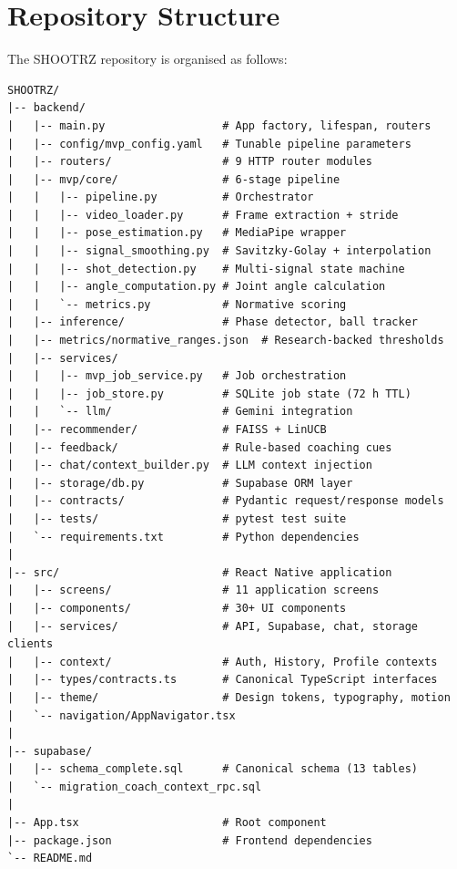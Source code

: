 
\chapter{Repository Structure}
\label{app:repo}

The SHOOTRZ repository is organised as follows:

\begin{lstlisting}[language={},caption={Top-level repository structure.},label={lst:repo}]
SHOOTRZ/
|-- backend/
|   |-- main.py                  # App factory, lifespan, routers
|   |-- config/mvp_config.yaml   # Tunable pipeline parameters
|   |-- routers/                 # 9 HTTP router modules
|   |-- mvp/core/                # 6-stage pipeline
|   |   |-- pipeline.py          # Orchestrator
|   |   |-- video_loader.py      # Frame extraction + stride
|   |   |-- pose_estimation.py   # MediaPipe wrapper
|   |   |-- signal_smoothing.py  # Savitzky-Golay + interpolation
|   |   |-- shot_detection.py    # Multi-signal state machine
|   |   |-- angle_computation.py # Joint angle calculation
|   |   `-- metrics.py           # Normative scoring
|   |-- inference/               # Phase detector, ball tracker
|   |-- metrics/normative_ranges.json  # Research-backed thresholds
|   |-- services/
|   |   |-- mvp_job_service.py   # Job orchestration
|   |   |-- job_store.py         # SQLite job state (72 h TTL)
|   |   `-- llm/                 # Gemini integration
|   |-- recommender/             # FAISS + LinUCB
|   |-- feedback/                # Rule-based coaching cues
|   |-- chat/context_builder.py  # LLM context injection
|   |-- storage/db.py            # Supabase ORM layer
|   |-- contracts/               # Pydantic request/response models
|   |-- tests/                   # pytest test suite
|   `-- requirements.txt         # Python dependencies
|
|-- src/                         # React Native application
|   |-- screens/                 # 11 application screens
|   |-- components/              # 30+ UI components
|   |-- services/                # API, Supabase, chat, storage clients
|   |-- context/                 # Auth, History, Profile contexts
|   |-- types/contracts.ts       # Canonical TypeScript interfaces
|   |-- theme/                   # Design tokens, typography, motion
|   `-- navigation/AppNavigator.tsx
|
|-- supabase/
|   |-- schema_complete.sql      # Canonical schema (13 tables)
|   `-- migration_coach_context_rpc.sql
|
|-- App.tsx                      # Root component
|-- package.json                 # Frontend dependencies
`-- README.md
\end{lstlisting}

